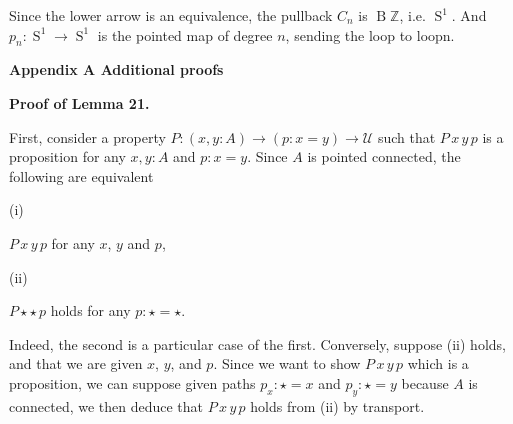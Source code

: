 \documentclass[10pt,a4paper]{article}
\begin{document}
Since the lower arrow is an equivalence, the pullback $C_{n}$ is $\operatorname{B}\mathbb{Z}$, i.e. $\operatorname{S}^{1}$. And $p_{n}:\operatorname{S}^{1}\to\operatorname{S}^{1}$ is the pointed map of degree $n$, sending the loop to loopn.\par
 
 
 
 
 



 
\par\medskip\noindent\textbf{Appendix A Additional proofs}\par
 
 
\par\medskip\noindent\textbf{Proof of Lemma 21.}\par
 
 
First, consider a property $P:(x,y:A)\to(p:x=y)\to\mathcal{U}$ such that $P\,x\,y\,p$ is a proposition for any $x,y:A$ and $p:x=y$. Since $A$ is pointed connected, the following are equivalent\par
  
\par\noindent  (i) 
 
$P\,x\,y\,p$ for any $x$, $y$ and $p$,\par
 
 
 
\par\noindent  (ii) 
 
$P\star\star\,p$ holds for any $p:\star=\star$.\par
 
 
  
Indeed, the second is a particular case of the first. Conversely, suppose (ii) holds, and that we are given $x$, $y$, and $p$. Since we want to show $P\,x\,y\,p$ which is a proposition, we can suppose given paths $p_{x}:\star=x$ and $p_{y}:\star=y$ because $A$ is connected, we then deduce that $P\,x\,y\,p$ holds from (ii) by transport.\par
 
 
\end{document}
